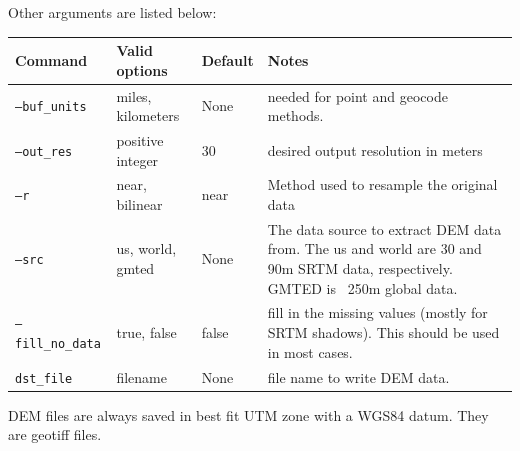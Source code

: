 \documentclass[12pt,oneside,final]{article}
\begin{document}
\noindent
Other arguments are listed below:
\medskip
\noindent
\begin{center}
\begin{tabular}{| l | l | l | p{2.75in} |}
    \hline
    Command & Valid options & Default & Notes \\ \hline
    \texttt{--buf\_units} & miles, kilometers & None & needed for point 
                                                       and geocode methods.
                                                       \\ \hline
    \texttt{--out\_res} & positive integer & 30 & desired output resolution in
                                                  meters \\ \hline
    \texttt{--r} & near, bilinear & near & Method used to resample the original
                                           data \\ \hline
    \texttt{--src} & us, world, gmted & None & The data source to extract DEM
                                               data from.  The us and world are
                                               30 and 90m SRTM data,
                                               respectively. GMTED is ~250m
                                               global data.
                                               \\ \hline
    \texttt{--fill\_no\_data} & true, false & false & fill in the missing values
                                                   (mostly for SRTM shadows).
                                                   This should be used in most
                                                   cases. \\ \hline
    \texttt{dst\_file} & filename & None & file name to write DEM data. \\
                                           \hline
\end{tabular}
\end{center}
DEM files are always saved in best fit UTM zone with a WGS84 datum.  They are geotiff files.
\end{document}
